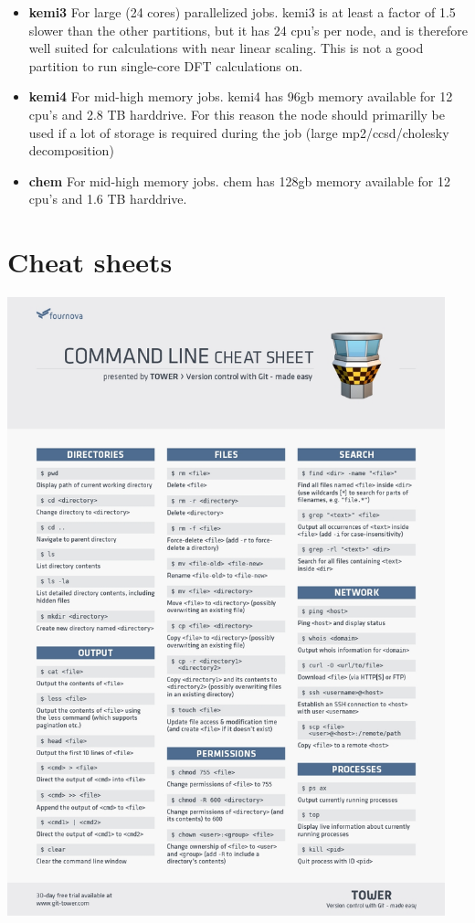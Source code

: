 \documentclass{article}
\begin{document}
\begin{itemize}

    \item {\bf kemi3} 
        For large (24 cores) parallelized jobs.
        kemi3 is at least a factor of 1.5 slower than the other partitions, but it has 24 cpu's per node, and is therefore well suited for calculations with near linear scaling.
        This is not a good partition to run single-core DFT calculations on.

    \item {\bf kemi4} 
        For mid-high memory jobs.
        kemi4 has 96gb memory available for 12 cpu's and 2.8 TB harddrive.
        For this reason the node should primarilly be used if a lot of storage is required
        during the job (large mp2/ccsd/cholesky decomposition)

    \item {\bf chem} 
        For mid-high memory jobs.
        chem has 128gb memory available for 12 cpu's and 1.6 TB harddrive.

\end{itemize}

\section{Cheat sheets}

\begin{center}
    \includegraphics[width=0.95\textwidth]{command-line-cheat-sheet}
\end{center}
\end{document}
